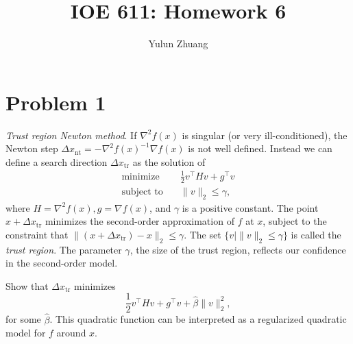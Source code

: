 \documentclass[11pt]{article}
\newcommand{\grad}{\nabla}
\newcommand{\hess}{\nabla^2}
\newcommand{\half}{\frac{1}{2}} %
\newcommand{\inv}{^{-1}}        %
\newcommand{\T}{^\top}          %
\begin{document}
\title{IOE 611: Homework 6}
\author{Yulun Zhuang}
\maketitle
\section*{Problem 1}
\textit{Trust region Newton method}.
If $\hess f(x)$ is singular (or very ill-conditioned), the Newton step $\Delta x_{\text{nt}} = -\hess f(x)\inv \grad f(x)$ is not well defined. Instead we can define a search direction $\Delta x_{\text{tr}}$ as the solution of
\begin{align*}
    \text{minimize}\quad & \half v\T H v + g\T v\\
    \text{subject to}\quad & \|v\|_2 \leq \gamma,
\end{align*}
where $H = \hess f(x), g = \grad f(x)$, and $\gamma$ is a positive constant. The point $x + \Delta x_{\text{tr}}$ minimizes the second-order approximation of $f$ at $x$, subject to the constraint that $\| (x + \Delta x_{\text{tr}}) - x\|_2 \leq \gamma$. The set $\{v \mid \|v\|_2\leq \gamma\}$ is called the \textit{trust region}. The parameter $\gamma$, the size of the trust region, reflects our confidence in the second-order model.

Show that $\Delta x_{\text{tr}}$ minimizes
\[
    \half v\T H v + g\T v + \hat \beta \|v\|_2^2,
\]
for some $\hat \beta$. This quadratic function can be interpreted as a regularized quadratic model for $f$ around $x$.
\end{document}
